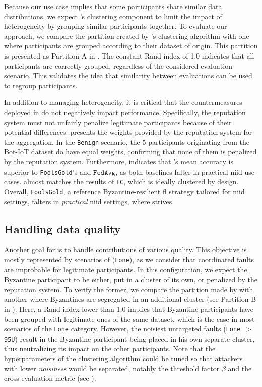Because our use case implies that some participants share similar data distributions, we expect \thecontrib's clustering component to limit the impact of heterogeneity by grouping similar participants together.
To evaluate our approach, we compare the partition created by \thecontrib's clustering algorithm with one where participants are grouped according to their dataset of origin.
This partition is presented as Partition A in .
The constant Rand index of 1.0 indicates that all participants are correctly grouped, regardless of the considered evaluation scenario.
This validates the idea that similarity between evaluations can be used to regroup participants. 

In addition to managing heterogeneity, it is critical that the countermeasures deployed in \thecontrib do not negatively impact performance.
Specifically, the reputation system must not unfairly penalize legitimate participants because of their potential differences.
 presents the weights provided by the reputation system for the aggregation. 
In the \texttt{Benign} scenario, the 5 participants originating from the Bot-IoT dataset do have equal weights, confirming that none of them is penalized by the reputation system.
Furthermore,  indicates that \thecontrib's mean accuracy is superior to \texttt{FoolsGold}'s and $\texttt{FedAvg}$, as both baselines falter in practical \gls{niid} use cases.
\thecontrib almost matches the results of \texttt{FC}, which is ideally clustered by design.
Overall, \texttt{FoolsGold}, a reference Byzantine-resilient \gls{fl} strategy tailored for \gls{niid} settings, falters in \emph{practical} \gls{niid} settings, where \thecontrib strives.


\subsection{Handling data quality\label{sec:radar.results.quality}}

Another goal for \thecontrib is to handle contributions of various quality.
This objective is mostly represented by scenarios of  (\texttt{Lone}), as we consider that coordinated faults are improbable for legitimate participants.
In this configuration, we expect the Byzantine participant to be either, put in a cluster of its own, or penalized by the reputation system.
To verify the former, we compare the partition made by \thecontrib with another where Byzantines are segregated in an additional cluster (see Partition B in ).
Here, a Rand index lower than 1.0 implies that Byzantine participants have been grouped with legitimate ones of the same dataset, which is the case in most scenarios of the \texttt{Lone} category.
However, the noisiest untargeted faults (\texttt{Lone~$>$95U}) result in the Byzantine participant being placed in his own separate cluster, thus neutralizing its impact on the other participants.
Note that the hyperparameters of the clustering algorithm could be tuned so that attackers with lower \emph{noisiness} would be separated, notably the threshold factor $\beta$ and the cross-evaluation metric (see ).

